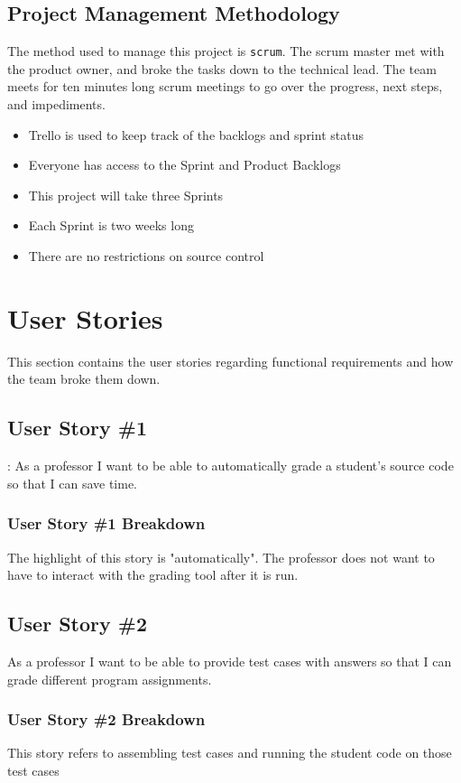\subsection{Project  Management Methodology}
The method used to manage this project is {\tt scrum}. The scrum master met with the product owner, and broke the tasks down to the technical lead. The team meets for ten minutes long scrum meetings to go over the progress, next steps, and impediments. 
 
\begin{itemize}
\item Trello is used to keep track of the backlogs and sprint status
\item Everyone has access to the Sprint and Product Backlogs
\item This project will take three Sprints
\item Each Sprint is two weeks long
\item There are no restrictions on source control 
\end{itemize}

\section{User Stories}
This section contains the user stories regarding functional requirements and how the team broke them down.


\subsection{User Story \#1}:
As a professor I want to be able to automatically grade a student's source code so that I can save time.

\subsubsection{User Story \#1 Breakdown} 
The highlight of this story is "automatically". The professor does not want to have to interact with the grading tool after it is run.
\subsection{User Story \#2} 

As a professor I want to be able to provide test cases with answers so that I can grade different program assignments.

\subsubsection{User Story \#2 Breakdown}
This story refers to assembling test cases and running the student code on those test cases

